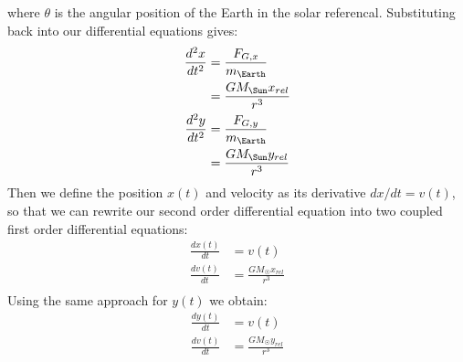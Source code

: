 \documentclass{article}
\begin{document}
where $\theta$ is the angular position of the Earth in the solar referencal.
Substituting back into our differential equations gives:
\begin{align*}
  \frac{d^2x}{dt^2} &= \frac{F_{G,x}}{m_{\Earth}}\\
  &= \frac{GM_{\Sun}x_{rel}}{r^3}\\
  \frac{d^2y}{dt^2} &= \frac{F_{G,y}}{m_{\Earth}}\\
  &= \frac{GM_{\Sun}y_{rel}}{r^3}\\
\end{align*}
Then we define the position $x(t)$ and velocity as its derivative $dx/dt=v(t)$, so that we can
rewrite our second order differential equation into two coupled first order differential equations:
\begin{align*}
  \frac{dx(t)}{dt} &= v(t)\\
  \frac{dv(t)}{dt} &= \frac{GM_{\Sun}x_{rel}}{r^3}\\
\end{align*}
Using the same approach for $y(t)$ we obtain:
\begin{align*}
  \frac{dy(t)}{dt} &= v(t)\\
  \frac{dv(t)}{dt} &= \frac{GM_{\Sun}y_{rel}}{r^3}\\
\end{align*}
\end{document}
